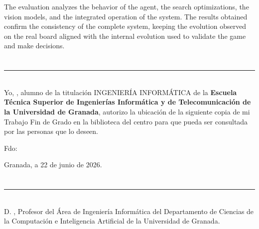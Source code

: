 The evaluation analyzes the behavior of the agent, the search optimizations, the vision models, and the integrated operation of the system. The results obtained confirm the consistency of the complete system, keeping the evolution observed on the real board aligned with the internal evolution used to validate the game and make decisions.



\chapter*{}
\thispagestyle{empty}

\noindent\rule[-1ex]{\textwidth}{2pt}\\[4.5ex]

Yo, \textbf{\myName}, alumno de la titulación INGENIERÍA INFORMÁTICA de la \textbf{Escuela Técnica Superior
de Ingenierías Informática y de Telecomunicación de la Universidad de Granada}, autorizo la
ubicación de la siguiente copia de mi Trabajo Fin de Grado en la biblioteca del centro para que pueda ser
consultada por las personas que lo deseen.

\vspace{6cm}

\noindent Fdo: \myName

\vspace{2cm}

\begin{flushright}
Granada, a 22 de junio de 2026.
\end{flushright}



\chapter*{}
\thispagestyle{empty}

\noindent\rule[-1ex]{\textwidth}{2pt}\\[4.5ex]

D. \textbf{\myProf}, Profesor del Área de Ingeniería Informática del Departamento de Ciencias de la Computación e Inteligencia Artificial de la Universidad de Granada.

